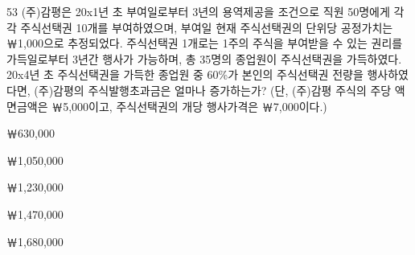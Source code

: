 \begin{question}{53}
(주)감평은 20x1년 초 부여일로부터 3년의 용역제공을 조건으로 직원 50명에게 각각 주식선택권 10개를 부여하였으며, 부여일 현재 주식선택권의 단위당 공정가치는 ￦1,000으로 추정되었다. 주식선택권 1개로는 1주의 주식을 부여받을 수 있는 권리를 가득일로부터 3년간 행사가 가능하며, 총 35명의 종업원이 주식선택권을 가득하였다. 20x4년 초 주식선택권을 가득한 종업원 중 60\%가 본인의 주식선택권 전량을 행사하였다면, (주)감평의 주식발행초과금은 얼마나 증가하는가? (단, (주)감평 주식의 주당 액면금액은 ￦5,000이고, 주식선택권의 개당 행사가격은 ￦7,000이다.)
\begin{choices}
  \item ￦630,000
  \item ￦1,050,000
  \item ￦1,230,000
  \item ￦1,470,000
  \item ￦1,680,000
\end{choices}
\end{question}

